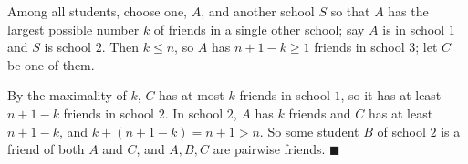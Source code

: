 Among all students, choose one, $A$, and another school $S$ so that $A$ has the largest possible number $k$ of friends in a single other school; say $A$ is in school $1$ and $S$ is school $2$. Then $k\le n$, so $A$ has $n+1-k\ge1$ friends in school $3$; let $C$ be one of them.

By the maximality of $k$, $C$ has at most $k$ friends in school $1$, so it has at least $n+1-k$ friends in school $2$. In school $2$, $A$ has $k$ friends and $C$ has at least $n+1-k$, and $k+(n+1-k)=n+1>n$. So some student $B$ of school $2$ is a friend of both $A$ and $C$, and $A,B,C$ are pairwise friends. $\blacksquare$
